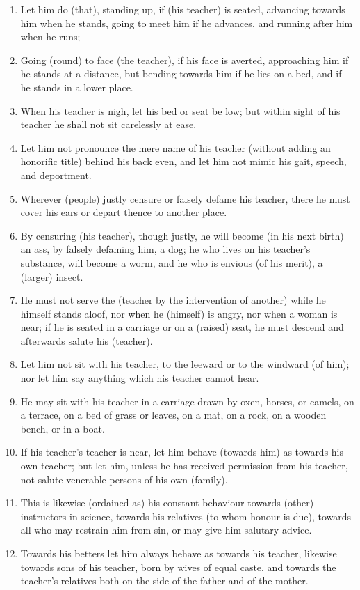\begin{enumerate}
\item Let him do (that), standing up, if (his teacher) is seated, advancing towards him when he stands, going to meet him if he advances, and running after him when he runs;
\item Going (round) to face (the teacher), if his face is averted, approaching him if he stands at a distance, but bending towards him if he lies on a bed, and if he stands in a lower place.
\item When his teacher is nigh, let his bed or seat be low; but within sight of his teacher he shall not sit carelessly at ease.
\item Let him not pronounce the mere name of his teacher (without adding an honorific title) behind his back even, and let him not mimic his gait, speech, and deportment.
\item Wherever (people) justly censure or falsely defame his teacher, there he must cover his ears or depart thence to another place.
\item By censuring (his teacher), though justly, he will become (in his next birth) an ass, by falsely defaming him, a dog; he who lives on his teacher's substance, will become a worm, and he who is envious (of his merit), a (larger) insect.
\item He must not serve the (teacher by the intervention of another) while he himself stands aloof, nor when he (himself) is angry, nor when a woman is near; if he is seated in a carriage or on a (raised) seat, he must descend and afterwards salute his (teacher).
\item Let him not sit with his teacher, to the leeward or to the windward (of him); nor let him say anything which his teacher cannot hear.
\item He may sit with his teacher in a carriage drawn by oxen, horses, or camels, on a terrace, on a bed of grass or leaves, on a mat, on a rock, on a wooden bench, or in a boat.
\item If his teacher's teacher is near, let him behave (towards him) as towards his own teacher; but let him, unless he has received permission from his teacher, not salute venerable persons of his own (family).
\item This is likewise (ordained as) his constant behaviour towards (other) instructors in science, towards his relatives (to whom honour is due), towards all who may restrain him from sin, or may give him salutary advice.
\item Towards his betters let him always behave as towards his teacher, likewise towards sons of his teacher, born by wives of equal caste, and towards the teacher's relatives both on the side of the father and of the mother.

\end{enumerate}
